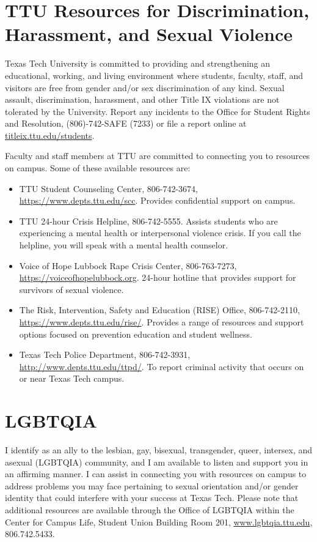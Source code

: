 \documentclass[12pt, notitlepage]{article}   	%
\begin{document}
{\section{TTU Resources for Discrimination, Harassment, and Sexual Violence}
Texas Tech University is committed to providing and strengthening an educational, 
working, and living environment where students, faculty, staff, and visitors are 
free from gender and/or sex discrimination of any kind. Sexual assault, discrimination, 
harassment, and other Title IX violations are not tolerated by the University. 
Report any incidents to the Office for Student Rights and Resolution, 
(806)-742-SAFE (7233) or file a report online at 
\url{titleix.ttu.edu/students}. 

Faculty and staff members at TTU are committed to connecting you to resources on campus. 
Some of these available resources are: 
\begin{itemize}
	\item{TTU Student Counseling Center, 806-742-3674, \url{https://www.depts.ttu.edu/scc}. 
		Provides confidential support on campus.} 
	\item{TTU 24-hour Crisis Helpline, 806-742-5555. 
		Assists students who are experiencing a mental health or interpersonal violence 
		crisis. If you call the helpline, you will speak with a mental health counselor.} 
	\item{Voice of Hope Lubbock Rape Crisis Center, 806-763-7273, 
		\url{https://voiceofhopelubbock.org}.
		24-hour hotline that provides support for survivors of sexual violence.} 
	\item{The Risk, Intervention, Safety and Education (RISE) Office, 806-742-2110, 
		\url{https://www.depts.ttu.edu/rise/}. Provides a range of resources and support 
		options focused on prevention education and student wellness.} 
	\item{Texas Tech Police Department, 806-742-3931, 
		\url{http://www.depts.ttu.edu/ttpd/}. 
		To report criminal activity that occurs on or near Texas Tech campus.}
\end{itemize}

\section{LGBTQIA}
I identify as an ally to the lesbian, gay, bisexual, transgender, queer, intersex, 
and asexual (LGBTQIA) community, and I am available to listen and support you in an 
affirming manner. I can assist in connecting you with resources on campus to address 
problems you may face pertaining to sexual orientation and/or gender identity that could 
interfere with your success at Texas Tech. Please note that additional resources are 
available through the Office of LGBTQIA within the Center for Campus Life, 
Student Union Building Room 201, 
\url{www.lgbtqia.ttu.edu}, 806.742.5433.

}
\end{document}
